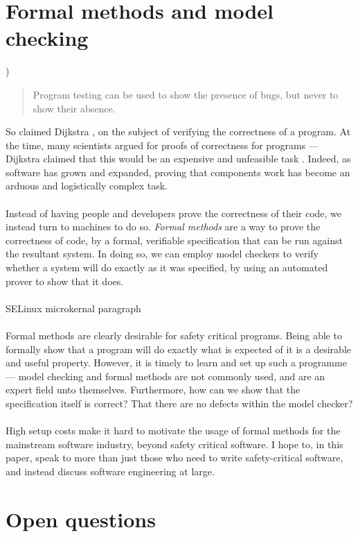\section{Formal methods and model checking} \label{sec:otherdets:modelCheck})

\begin{quote}
Program testing can be used to show the presence of bugs, but never to show their absence.
\end{quote}

So claimed Dijkstra \FIXME, on the subject of verifying the correctness of a program.
At the time, many scientists argued for proofs of correctness for programs --- Dijkstra claimed that
this would be an expensive and unfeasible task \FIXME.
Indeed, as software has grown and expanded, proving that components work has become an arduous and
logistically complex task.\\
\\
Instead of having people and developers prove the correctness of their code, we instead turn to
machines to do so.
{\em Formal methods} are a way to prove the correctness of code, by a formal, verifiable
specification that can be run against the resultant system.
In doing so, we can employ model checkers to verify whether a system will do exactly as it was
specified, by using an automated prover to show that it does.\\
\\
\FIXME SELinux microkernal paragraph\\
\\
Formal methods are clearly desirable for safety critical programs.
Being able to formally show that a program will do exactly what is expected of it is a desirable and
useful property.
However, it is timely to learn and set up such a programme --- model checking and formal methods are
not commonly used, and are an expert field unto themselves.
Furthermore, how can we show that the specification itself is correct?
That there are no defects within the model checker?\\
\\
High setup costs make it hard to motivate the usage of formal methods for the mainstream software
industry, beyond safety critical software.
I hope to, in this paper, speak to more than just those who need to write safety-critical software,
and instead discuss software engineering at large.

\section{Open questions}

